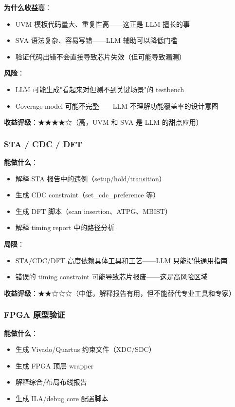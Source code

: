 \documentclass[UTF8,a4paper,10pt,oneside]{ctexart}
\begin{document}
\textbf{为什么收益高}：
\begin{itemize}
    \item UVM 模板代码量大、重复性高——这正是 LLM 擅长的事
    \item SVA 语法复杂、容易写错——LLM 辅助可以降低门槛
    \item 验证代码出错不会直接导致芯片失效（但可能导致漏测）
\end{itemize}

\textbf{风险}：
\begin{itemize}
    \item LLM 可能生成"看起来对但测不到关键场景"的 testbench
    \item Coverage model 可能不完整——LLM 不理解功能覆盖率的设计意图
\end{itemize}

\textbf{收益评级}：★★★★☆（高，UVM 和 SVA 是 LLM 的甜点应用）

\subsubsection{STA / CDC / DFT}

\textbf{能做什么}：
\begin{itemize}
    \item 解释 STA 报告中的违例（setup/hold/transition）
    \item 生成 CDC constraint（set\_cdc\_preference 等）
    \item 生成 DFT 脚本（scan insertion、ATPG、MBIST）
    \item 解释 timing report 中的路径分析
\end{itemize}

\textbf{局限}：
\begin{itemize}
    \item STA/CDC/DFT 高度依赖具体工具和工艺——LLM 只能提供通用指南
    \item 错误的 timing constraint 可能导致芯片报废——这是高风险区域
\end{itemize}

\textbf{收益评级}：★★☆☆☆（中低，解释报告有用，但不能替代专业工具和专家）

\subsubsection{FPGA 原型验证}

\textbf{能做什么}：
\begin{itemize}
    \item 生成 Vivado/Quartus 约束文件（XDC/SDC）
    \item 生成 FPGA 顶层 wrapper
    \item 解释综合/布局布线报告
    \item 生成 ILA/debug core 配置脚本
\end{itemize}
\end{document}
